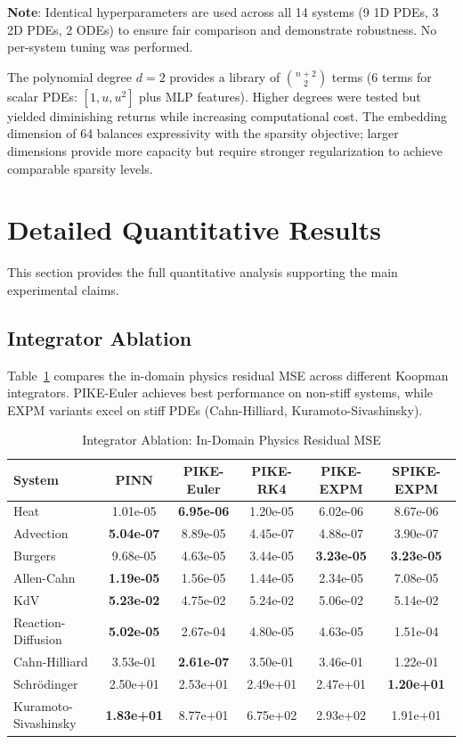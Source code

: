 \documentclass{article}
\theoremstyle{remark}
\begin{document}
\textbf{Note}: Identical hyperparameters are used across all 14 systems (9 1D PDEs, 3 2D PDEs, 2 ODEs) to ensure fair comparison and demonstrate robustness. No per-system tuning was performed.

The polynomial degree $d=2$ provides a library of $\binom{n+2}{2}$ terms (6 terms for scalar PDEs: $[1, u, u^2]$ plus MLP features). Higher degrees were tested but yielded diminishing returns while increasing computational cost. The embedding dimension of 64 balances expressivity with the sparsity objective; larger dimensions provide more capacity but require stronger regularization to achieve comparable sparsity levels.

\FloatBarrier
\section{Detailed Quantitative Results}
\label{app:detailed_results}

This section provides the full quantitative analysis supporting the main experimental claims.

\subsection{Integrator Ablation}

Table~\ref{tab:integrator_ablation} compares the in-domain physics residual MSE across different Koopman integrators. PIKE-Euler achieves best performance on non-stiff systems, while EXPM variants excel on stiff PDEs (Cahn-Hilliard, Kuramoto-Sivashinsky).

\begin{table}[H]
\centering
\caption{Integrator Ablation: In-Domain Physics Residual MSE}
\label{tab:integrator_ablation}
\begin{tabular}{lccccc}
\toprule
System & PINN & PIKE-Euler & PIKE-RK4 & PIKE-EXPM & SPIKE-EXPM \\
\midrule
Heat & 1.01e-05 & \textbf{6.95e-06} & 1.20e-05 & 6.02e-06 & 8.67e-06 \\
Advection & \textbf{5.04e-07} & 8.89e-05 & 4.45e-07 & 4.88e-07 & 3.90e-07 \\
Burgers & 9.68e-05 & 4.63e-05 & 3.44e-05 & \textbf{3.23e-05} & \textbf{3.23e-05} \\
Allen-Cahn & \textbf{1.19e-05} & 1.56e-05 & 1.44e-05 & 2.34e-05 & 7.08e-05 \\
KdV & \textbf{5.23e-02} & 4.75e-02 & 5.24e-02 & 5.06e-02 & 5.14e-02 \\
Reaction-Diffusion & \textbf{5.02e-05} & 2.67e-04 & 4.80e-05 & 4.63e-05 & 1.51e-04 \\
Cahn-Hilliard & 3.53e-01 & \textbf{2.61e-07} & 3.50e-01 & 3.46e-01 & 1.22e-01 \\
Schr\"odinger & 2.50e+01 & 2.53e+01 & 2.49e+01 & 2.47e+01 & \textbf{1.20e+01} \\
Kuramoto-Sivashinsky & \textbf{1.83e+01} & 8.77e+01 & 6.75e+02 & 2.93e+02 & 1.91e+01 \\
\bottomrule
\end{tabular}
\end{table}
\end{document}
